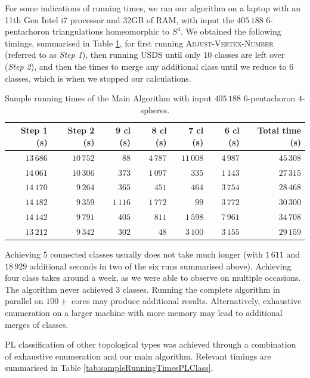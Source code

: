 \documentclass[pdflatex,sn-mathphys-num]{sn-jnl}
\theoremstyle{thmstyleone}%
\theoremstyle{thmstyletwo}%
\theoremstyle{thmstylethree}%
\theoremstyle{remark}
\begin{document}
For some indications of running times, we ran our algorithm on a laptop with an 11th Gen Intel i7 processor and 32GB of RAM, with input the $405\,188$ $6$-pentachoron triangulations homeomorphic to $S^4$. We obtained the following timings, summarised in Table \ref{tab:sampleRunningTimesMain}, for first running \textsc{Adjust-Vertex-Number} (referred to as {\em Step 1}), then running USDS until only 10 classes are left over ({\em Step 2}), and then the times to merge any additional class until we reduce to 6 classes, which is when we stopped our calculations.


\begin{table}[h]
	\caption{Sample running times of the Main Algorithm with input $405\,188$ $6$-pentachoron $4$-spheres.}
	\label{tab:sampleRunningTimesMain}
\begin{tabular}{rr|rrrr|r}
\toprule
Step 1 (s) & Step 2 (s) & 9 cl (s) & 8 cl (s) & 7 cl (s) & 6 cl (s) & Total time (s) \\
\midrule
$13\,686$&$10\,752$&$88$&$4\,787$&$11\,008$&$4\,987$&$45\,308$ \\
$14\,061$&$10\,306$&$373$&$1\,097$&$335$&$1\,143$&$27\,315$ \\
$14\,170$&$9\,264$&$365$&$451$&$464$&$3\,754$&$28\,468$\\
$14\,182$&$9\,359$&$1\,116$&$1\,772$&$99$&$3\,772$&$30\,300$\\%
$14\,142$&$9\,791$&$405$&$811$&$1\,598$&$7\,961$&$34\,708$ \\
$13\,212$&$9\,342$&$302$&$48$&$3\,100$&$3\,155$&$29\,159$\\%
\bottomrule
\end{tabular}
\end{table}

Achieving 5 connected classes usually does not take much longer (with $1\, 611$ and $18\, 929$ additional seconds in two of the six runs summarised above). Achieving four class takes around a week, as we were able to observe on multiple occasions. The algorithm never achieved 3 classes. Running the complete algorithm in parallel on $100+$ cores may produce additional results. Alternatively, exhaustive enumeration on a larger machine with more memory may lead to additional merges of classes.

PL classification of other topological types was achieved through a combination of exhaustive enumeration and our main algorithm. Relevant timings are summarised in Table \ref{tab:sampleRunningTimesPLClass}.
\end{document}
